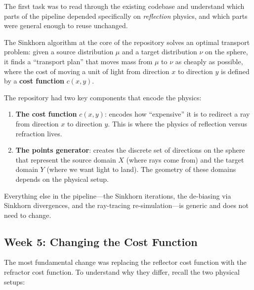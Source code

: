 \documentclass{article}
\begin{document}
The first task was to read through the existing codebase and understand which parts of the
pipeline depended specifically on \emph{reflection} physics, and which parts were general
enough to reuse unchanged.

The Sinkhorn algorithm at the core of the repository solves an optimal transport problem:
given a source distribution $\mu$ and a target distribution $\nu$ on the sphere, it finds
a ``transport plan'' that moves mass from $\mu$ to $\nu$ as cheaply as possible, where the
cost of moving a unit of light from direction $x$ to direction $y$ is defined by a
\textbf{cost function} $c(x, y)$.

The repository had two key components that encode the physics:
\begin{enumerate}
    \item \textbf{The cost function} $c(x,y)$: encodes how ``expensive'' it is to redirect
    a ray from direction $x$ to direction $y$. This is where the physics of reflection
    versus refraction lives.
    \item \textbf{The points generator}: creates the discrete set of directions on the
    sphere that represent the source domain $X$ (where rays come from) and the target
    domain $Y$ (where we want light to land). The geometry of these domains depends on
    the physical setup.
\end{enumerate}

Everything else in the pipeline---the Sinkhorn iterations, the de-biasing via Sinkhorn
divergences, and the ray-tracing re-simulation---is generic and does not need to change.

\subsection{Week 5: Changing the Cost Function}

The most fundamental change was replacing the reflector cost function with the refractor
cost function. To understand why they differ, recall the two physical setups:
\end{document}
